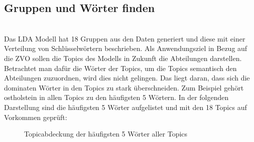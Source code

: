\documentclass[german,version-2020-11]{uzl-thesis}
\begin{document}
\subsection{Gruppen und Wörter finden}\\
Das LDA Modell hat 18 Gruppen aus den Daten generiert und diese mit einer Verteilung von Schlüsselwörtern beschrieben. Als Anwendungsziel in Bezug auf die ZVO sollen die Topics des Modells in Zukunft die Abteilungen darstellen. Betrachtet man dafür die Wörter der Topics, um die Topics semantisch den Abteilungen zuzuordnen, wird dies nicht gelingen. Das liegt daran, dass sich die dominaten Wörter in den Topics zu stark überschneiden. Zum Beispiel gehört ostholstein in allen Topics zu den häufigsten 5 Wörtern. In der folgenden Darstellung sind die häufigsten 5 Wörter aufgelistet und mit den 18 Topics auf Vorkommen geprüft: 

\begin{figure}[H]
\begin{center}
\caption{Topicabdeckung der häufigsten 5 Wörter aller Topics}
\label{fig:top5}
\end{center}
\end{figure}
\end{document}
